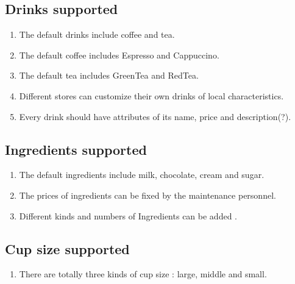 \documentclass[a4paper]{report}
\begin{document}
\subsection{Drinks supported}
\begin{enumerate}
\item The default drinks include coffee and tea.
\item The default coffee includes Espresso and Cappuccino.
\item The default tea includes GreenTea and RedTea.
\item Different stores can customize their own drinks of local characteristics.
\item Every drink should have attributes of its name, price and description(?).

\end{enumerate}

\subsection{Ingredients supported}
\begin{enumerate}
\item The default ingredients include milk, chocolate, cream and sugar.
\item The prices of ingredients can be fixed by the maintenance personnel.
\item Different kinds and numbers of Ingredients can be added .
\end{enumerate}

\subsection{Cup size supported}
\begin{enumerate}
\item There are totally three kinds of cup size : large, middle and small.
\end{enumerate}
\end{document}
